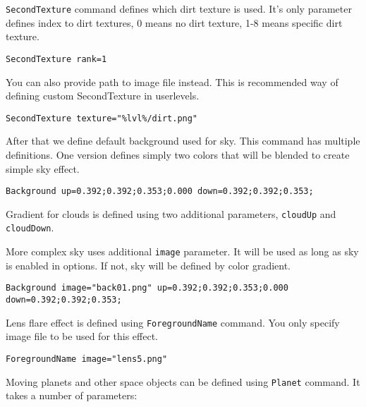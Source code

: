 \texttt{SecondTexture} command defines which dirt texture is used. It's only parameter defines index to dirt textures, 0 means no dirt texture, 1-8 means specific dirt texture.

\begin{lstlisting}[style=scene]
SecondTexture rank=1
\end{lstlisting}

You can also provide path to image file instead. This is recommended way of defining custom SecondTexture in userlevels.
\begin{lstlisting}[style=scene]
SecondTexture texture="%lvl%/dirt.png"
\end{lstlisting}


After that we define default background used for sky. This command has multiple definitions. One version defines simply two colors that will be blended to create simple sky effect.

\begin{lstlisting}[style=scene]
Background up=0.392;0.392;0.353;0.000 down=0.392;0.392;0.353;
\end{lstlisting}

Gradient for clouds is defined using two additional parameters, \texttt{cloudUp} and \texttt{cloudDown}.


More complex sky uses additional \texttt{image} parameter. It will be used as long as sky is enabled in options. If not, sky will be defined by color gradient.

\begin{lstlisting}[style=scene]
Background image="back01.png" up=0.392;0.392;0.353;0.000 down=0.392;0.392;0.353;
\end{lstlisting}

Lens flare effect is defined using \texttt{ForegroundName} command. You only specify image file to be used for this effect.

\begin{lstlisting}[style=scene]
ForegroundName image="lens5.png"
\end{lstlisting}


Moving planets and other space objects can be defined using \texttt{Planet} command. It takes a number of parameters:

